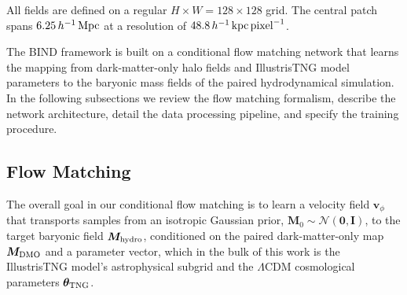 \documentclass[linenumbers,trackchanges, twocolumn]{aastex701}
\begin{document}
All fields are defined on a regular $H \times W = 128 \times 128$ grid. The central patch spans $6.25\,h^{-1}\,{\rm Mpc}$ at a resolution of $48.8\,h^{-1}\,{\rm kpc\,pixel}^{-1}$.

The \textsc{BIND} framework is built on a conditional flow matching network that learns the mapping from dark-matter-only halo fields and IllustrisTNG model parameters to the baryonic mass fields of the paired hydrodynamical simulation. In the following subsections we review the flow matching formalism, describe the network architecture, detail the data processing pipeline, and specify the training procedure.

\subsection{Flow Matching}
\label{subsec:fm}

The overall goal in our conditional flow matching is to learn a velocity field $\bm{v}_{\phi}$ that transports samples from an isotropic Gaussian prior, $\bm{M}_0 \sim \mathcal{N}(\bm{0},\bm{I})$, to the target baryonic field $\bm{M}_{\rm hydro}$, conditioned on the paired dark-matter-only map $\bm{M}_{\rm DMO}$ and a parameter vector, which in the bulk of this work is the IllustrisTNG model's astrophysical subgrid and the $\Lambda$CDM cosmological parameters $\boldsymbol{\theta}_{\rm TNG}$.
\end{document}
